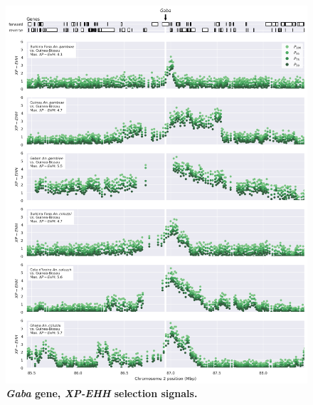 \documentclass[a4paper,11pt,abstracton,hidelinks]{scrartcl}
\begin{document}
\begin{figure}[t!]
	\begin{center}
		\includegraphics*[width=1.1\linewidth,center]{artwork/locus_gaba_xpehh.png}
	\end{center}
	\caption[\textit{Gaba} gene, \textit{XP-EHH} selection signals]{
	\textbf{\textit{Gaba} gene, \textit{XP-EHH} selection signals.}
	} 
	\label{fig:locus_gaba_xpehh}
\end{figure}


\clearpage
\end{document}
